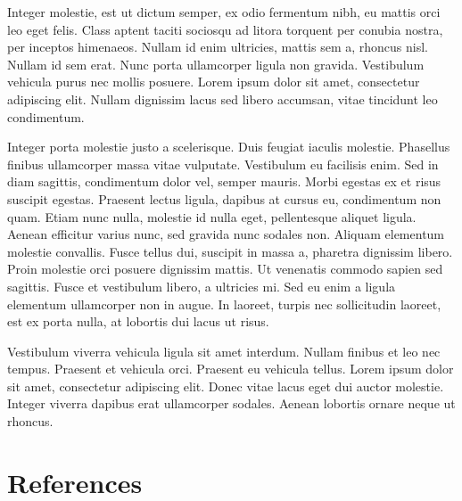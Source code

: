 \documentclass[5p]{elsarticle}
\begin{document}
	Integer molestie, est ut dictum semper, ex odio fermentum nibh, eu mattis orci leo eget felis. Class aptent taciti sociosqu ad litora torquent per conubia nostra, per inceptos himenaeos. Nullam id enim ultricies, mattis sem a, rhoncus nisl. Nullam id sem erat. Nunc porta ullamcorper ligula non gravida. Vestibulum vehicula purus nec mollis posuere. Lorem ipsum dolor sit amet, consectetur adipiscing elit. Nullam dignissim lacus sed libero accumsan, vitae tincidunt leo condimentum.

	Integer porta molestie justo a scelerisque. Duis feugiat iaculis molestie. Phasellus finibus ullamcorper massa vitae vulputate. Vestibulum eu facilisis enim. Sed in diam sagittis, condimentum dolor vel, semper mauris. Morbi egestas ex et risus suscipit egestas. Praesent lectus ligula, dapibus at cursus eu, condimentum non quam. Etiam nunc nulla, molestie id nulla eget, pellentesque aliquet ligula. Aenean efficitur varius nunc, sed gravida nunc sodales non. Aliquam elementum molestie convallis. Fusce tellus dui, suscipit in massa a, pharetra dignissim libero. Proin molestie orci posuere dignissim mattis. Ut venenatis commodo sapien sed sagittis. Fusce et vestibulum libero, a ultricies mi. Sed eu enim a ligula elementum ullamcorper non in augue. In laoreet, turpis nec sollicitudin laoreet, est ex porta nulla, at lobortis dui lacus ut risus.

	Vestibulum viverra vehicula ligula sit amet interdum. Nullam finibus et leo nec tempus. Praesent et vehicula orci. Praesent eu vehicula tellus. Lorem ipsum dolor sit amet, consectetur adipiscing elit. Donec vitae lacus eget dui auctor molestie. Integer viverra dapibus erat ullamcorper sodales. Aenean lobortis ornare neque ut rhoncus.
	
	\section*{References}
	
\end{document}
